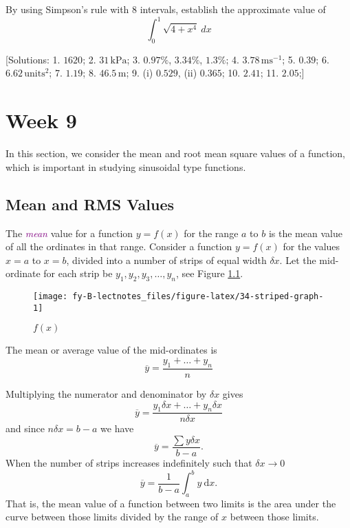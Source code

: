 \documentclass[
  english,
  11pt,
  oneside]{book}
\newcommand{\slide}{}
\theoremstyle{definition}
\theoremstyle{definition}
\theoremstyle{definition}
\theoremstyle{definition}
\theoremstyle{remark}
\begin{document}
By using Simpson's rule with 8 intervals, establish the approximate value of
\[
\int_0^1\sqrt{4+x^4}\ dx
\]

{[}Solutions:
1. \(1620\);
2. \(31\,\text{kPa}\);
3. \(0.97\%\), \(3.34\%\), \(1.3\%\);
4. \(3.78\,\text{ms}^{-1}\);
5. \(0.39\);
6. \(6.62\,\text{units}^2\);
7. \(1.19\);
8. \(46.5\,\text{m}\);
9. (i) \(0.529\), (ii) \(0.365\);
10. \(2.41\);
11. \(2.05\);{]}

\chapter{Week 9}\label{week-nine}

In this section, we consider the mean and root mean square values of a function, which is important in studying sinusoidal type functions.

\slide

\section{Mean and RMS Values}\label{mean-and-rms-values}

The \textcolor{purple}{\em mean} value for a function \(y = f(x)\) for the range \(a\) to \(b\) is the mean value of all the ordinates in that range. Consider a function \(y = f(x)\) for the values \(x = a\) to \(x = b\), divided into a number of strips of equal width \(\delta x\). Let the mid-ordinate for each strip be \(y_1, y_2, y_3,\ldots,y_n\), see Figure \ref{fig:34-striped-graph}.

\begin{figure}

{\centering \texttt{[image: fy-B-lectnotes\_files/figure-latex/34-striped-graph-1]} 

}

\caption{$f(x)$}\label{fig:34-striped-graph}
\end{figure}

The mean or average value of the mid-ordinates is
\[
\overline y=\frac{y_1+\ldots+y_n}{n}
\]
\slide

Multiplying the numerator and denominator by \(\delta x\) gives
\[
\overline y=\frac{y_1\delta x+\ldots+y_n\delta x}{n\delta x}
\]
and since \(n\delta x = b - a\) we have
\[
\overline y = \frac{\sum y\delta x}{b-a}.
\]
When the number of strips increases indefinitely such that \(\delta x \to 0\)
\[
\overline y = \frac{1}{b-a}\int_a^b y\ \mathrm{d}x.
\]
That is, the mean value of a function between two limits is the area under the curve between those limits divided by the range of \(x\) between those limits.
\end{document}
